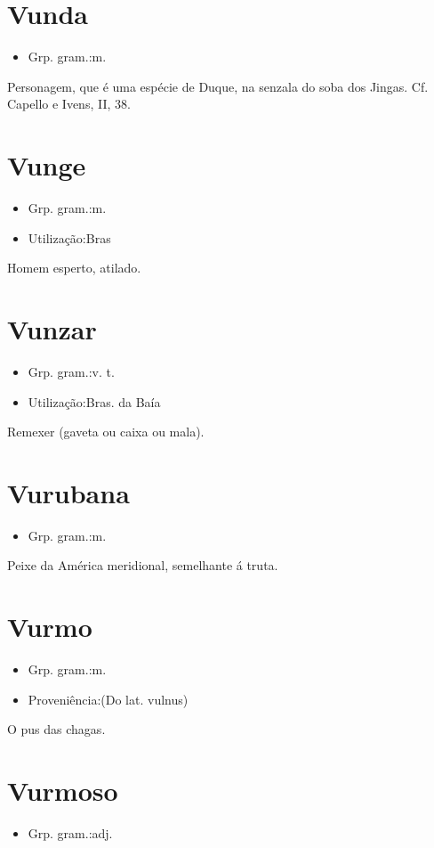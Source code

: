 \documentclass{article}
\begin{document}
\section{Vunda}
\begin{itemize}
\item {Grp. gram.:m.}
\end{itemize}
Personagem, que é uma espécie de Duque, na senzala do soba dos Jingas. Cf. Capello e Ivens, II, 38.
\section{Vunge}
\begin{itemize}
\item {Grp. gram.:m.}
\end{itemize}
\begin{itemize}
\item {Utilização:Bras}
\end{itemize}
Homem esperto, atilado.
\section{Vunzar}
\begin{itemize}
\item {Grp. gram.:v. t.}
\end{itemize}
\begin{itemize}
\item {Utilização:Bras. da Baía}
\end{itemize}
Remexer (gaveta ou caixa ou mala).
\section{Vurubana}
\begin{itemize}
\item {Grp. gram.:m.}
\end{itemize}
Peixe da América meridional, semelhante á truta.
\section{Vurmo}
\begin{itemize}
\item {Grp. gram.:m.}
\end{itemize}
\begin{itemize}
\item {Proveniência:(Do lat. \textunderscore vulnus\textunderscore )}
\end{itemize}
O pus das chagas.
\section{Vurmoso}
\begin{itemize}
\item {Grp. gram.:adj.}
\end{itemize}
\end{document}

